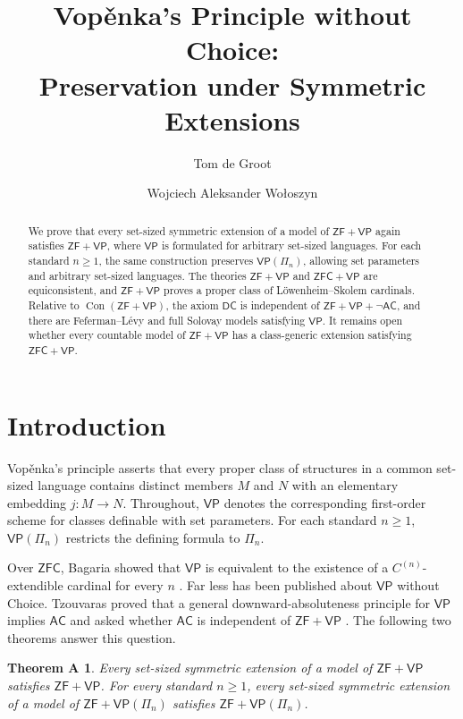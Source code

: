 \documentclass[11pt,a4paper]{amsart}
\title[Vop\v{e}nka's Principle without Choice]{Vop\v{e}nka's Principle without Choice:\\ Preservation under Symmetric Extensions}
\author{Tom de Groot}
\author{Wojciech Aleksander Wo{\l}oszyn}
\date{}
\newcommand{\VP}{\mathsf{VP}}
\newcommand{\AC}{\mathsf{AC}}
\newcommand{\ZF}{\mathsf{ZF}}
\newcommand{\ZFC}{\mathsf{ZFC}}
\newcommand{\Con}{\operatorname{Con}}
\newcommand{\DC}{\mathsf{DC}}
\theoremstyle{plain}
\newtheorem*{thmA}{Theorem A}
\theoremstyle{definition}
\theoremstyle{remark}
\begin{document}
\begin{abstract}

We prove that every set-sized symmetric extension of a model of \(\ZF+\VP\) again satisfies \(\ZF+\VP\), where \(\VP\) is formulated for arbitrary set-sized languages.  For each standard \(n\geq1\), the same construction preserves \(\VP(\Pi_n)\), allowing set parameters and arbitrary set-sized languages.  The theories \(\ZF+\VP\) and \(\ZFC+\VP\) are equiconsistent, and \(\ZF+\VP\) proves a proper class of L\"owenheim--Skolem cardinals.  Relative to \(\Con(\ZF+\VP)\), the axiom \(\DC\) is independent of \(\ZF+\VP+\neg\AC\), and there are Feferman--L\'evy and full Solovay models satisfying \(\VP\).  It remains open whether every countable model of \(\ZF+\VP\) has a class-generic extension satisfying \(\ZFC+\VP\).

\end{abstract}

\maketitle

\section{Introduction}

Vop\v{e}nka's principle asserts that every proper class of structures in a common set-sized language contains distinct members $M$ and $N$ with an elementary embedding $j:M\to N$.  Throughout, $\VP$ denotes the corresponding first-order scheme for classes definable with set parameters.  For each standard $n\geq1$, $\VP(\Pi_n)$ restricts the defining formula to $\Pi_n$.

Over $\ZFC$, Bagaria showed that $\VP$ is equivalent to the existence of a $C^{(n)}$-extendible cardinal for every $n$ \cite{BagariaCn}.  Far less has been published about $\VP$ without Choice.  Tzouvaras proved that a general downward-absoluteness principle for $\VP$ implies $\AC$ and asked whether $\AC$ is independent of $\ZF+\VP$ \cite[Question~4.1]{Tzouvaras}.  The following two theorems answer this question.

\begin{thmA}
Every set-sized symmetric extension of a model of $\ZF+\VP$ satisfies $\ZF+\VP$.  For every standard $n\geq1$, every set-sized symmetric extension of a model of $\ZF+\VP(\Pi_n)$ satisfies $\ZF+\VP(\Pi_n)$.
\end{thmA}
\end{document}
